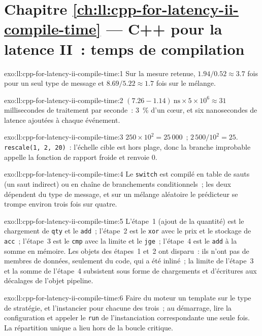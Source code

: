 \section*{Chapitre \ref{ch:ll:cpp-for-latency-ii-compile-time} --- C++ pour la latence II~: temps de compilation}

\begin{solution}{exo:ll:cpp-for-latency-ii-compile-time:1}
Sur la mesure retenue, $1.94/0.52 \approx 3.7$ fois pour un seul type de message et $8.69/5.22 \approx 1.7$ fois sur le
mélange.
\end{solution}

\begin{solution}{exo:ll:cpp-for-latency-ii-compile-time:2}
$(7.26 - 1.14)\ \text{ns} \times 5 \times 10^6 \approx 31$ millisecondes de traitement par seconde~: 3~\% d'un cœur, et six
nanosecondes de latence ajoutées à chaque événement.
\end{solution}

\begin{solution}{exo:ll:cpp-for-latency-ii-compile-time:3}
$250 \times 10^2 = 25\,000$~; $2\,500 / 10^2 = 25$. \texttt{rescale(1, 2, 20)}~: l'échelle cible est hors plage, donc la
branche improbable appelle la fonction de rapport froide et renvoie 0.
\end{solution}

\begin{solution}{exo:ll:cpp-for-latency-ii-compile-time:4}
Le \texttt{switch} est compilé en table de sauts (un saut indirect) ou en chaîne de branchements conditionnels~; les deux dépendent du
type de message, et sur un mélange aléatoire le prédicteur se trompe environ trois fois sur quatre.
\end{solution}

\begin{solution}{exo:ll:cpp-for-latency-ii-compile-time:5}
L'étape~1 (ajout de la quantité) est le chargement de \texttt{qty} et le \texttt{add}~; l'étape~2 est le \texttt{xor} avec le prix et le
stockage de \texttt{acc}~; l'étape~3 est le \texttt{cmp} avec la limite et le \texttt{jge}~; l'étape~4 est le \texttt{add} à la somme en
mémoire. Les objets des étapes~1 et~2 ont disparu~: ils n'ont pas de membres de données, seulement du code, qui a été inliné~; la
limite de l'étape~3 et la somme de l'étape~4 subsistent sous forme de chargements et d'écritures aux décalages de l'objet pipeline.
\end{solution}

\begin{solution}{exo:ll:cpp-for-latency-ii-compile-time:6}
Faire du moteur un template sur le type de stratégie, et l'instancier pour chacune des trois~; au démarrage, lire la
configuration et appeler le \texttt{run} de l'instanciation correspondante une seule fois. La répartition unique a lieu hors de la
boucle critique.
\end{solution}

